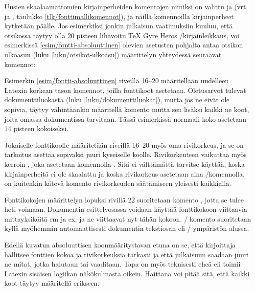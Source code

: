 Uusien skaalaamattomien kirjainperheiden komentojen nimiksi on valittu
 ja  (vrt.
 ja , taulukko
\ref{tlk/fonttimallikomennot}), ja näillä komennoilla kirjainperheet
kytketään päälle. Jos esimerkiksi jonkin julkaisun vaatimuksiin kuuluu,
että otsikossa täytyy olla 20 pisteen lihavoitu TeX Gyre Heros
\=/kirjainleikkaus, voi esimerkissä \ref{esim/fontti-absoluuttinen}
olevien asetusten pohjalta antaa otsikon ulkoasun (luku
\ref{luku/otsikot-ulkoasu}) määrittelyn yhteydessä seuraavat komennot:

\begin{koodilohkosis}
\sffamilyabs\Large\bfseries
\end{koodilohkosis}

\noindent
Esimerkin \ref{esim/fontti-absoluuttinen} riveillä 16--20 määritellään
uudelleen Latexin korkean tason komennot, joilla fonttikoot asetetaan.
Oletusarvot tulevat dokumenttiluokasta (luku
\ref{luku/dokumenttiluokat}), mutta jos ne eivät ole sopivia, täytyy
vähintäänkin määritellä komento  mutta sen lisäksi
kaikki ne koot, joita omassa dokumentissa tarvitaan. Tässä esimerkissä
normaali koko asetetaan 14 pisteen kokoiseksi.

Jokaiselle fonttikoolle määritetään riveillä 16--20 myös oma
rivikorkeus, ja se on tarkoitus asettaa sopivaksi juuri kyseiselle
koolle. Rivikorkeuteen vaikuttaa myös kerroin ,
joka asetetaan komennolla . Sitä ei välttämättä
tarvitse käyttää, koska kirjainperheitä ei ole skaalattu ja koska
rivikorkeus asetetaan aina \-/komennolla.
 on kuitenkin kätevä komento rivikorkeuden
säätämiseen yleisesti kaikkialla.

Fonttikokojen määrittelyn lopuksi rivillä 22 suoritetaan komento
, jotta se tulee heti voimaan. Dokumentin
esittelyosassa voidaan käyttää fonttikokoon viittaavia mittayksiköitä em
ja ex, ja ne viittaavat nyt tähän kokoon. \-/
komento suoritetaan kyllä myöhemmin automaattisesti dokumentin
tekstiosan eli \-/ ympäristön alussa.

Edellä kuvatun absoluuttisen koonmääritystavan etuna on se, että
kirjoittaja hallitsee fonttien kokoa ja rivikorkeuksia tarkasti ja että
julkaisuun saadaan juuri ne mitat, jotka halutaan tai vaaditaan. Tapa on
myös teknisesti eheä eli toimii Latexin sisäisen logiikan näkökulmasta
oikein. Haittana voi pitää sitä, että kaikki koot täytyy määritellä
erikseen.


